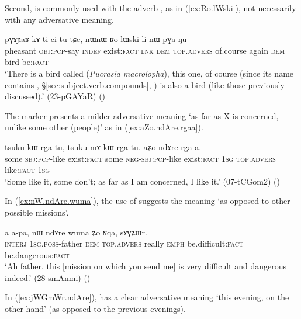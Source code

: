 Second,  is commonly used with the adverb , as in (\ref{ex:Ro.lWski}), not necessarily with any adversative meaning.

\begin{exe}
\ex \label{ex:Ro.lWski}
\gll  pɣɤɲaʁ kɤ-ti ci tu tɕe, nɯnɯ ʁo lɯski li nɯ pɣa ŋu \\
pheasant \textsc{obj}:\textsc{pcp}-say \textsc{indef} exist:\textsc{fact} \textsc{lnk} \textsc{dem} \textsc{top}.\textsc{advers} of.course again \textsc{dem} bird be:\textsc{fact} \\
\glt `There is a bird called  (\textit{Pucrasia macrolopha}), this one, of course (since its name contains , §\ref{sec:subject.verb.compounds}, ) is also a bird (like those previously discussed).' (23-pGAYaR)
()
\end{exe}

The marker  presents a milder adversative meaning `as far as X is concerned, unlike some other (people)' as in (\ref{ex:aZo.ndAre.rgaa}).  

\begin{exe}
\ex \label{ex:aZo.ndAre.rgaa}
\gll tsuku kɯ-rga tu, tsuku mɤ-kɯ-rga tu. aʑo ndɤre rga-a. \\
some \textsc{sbj}:\textsc{pcp}-like exist:\textsc{fact} some \textsc{neg}-\textsc{sbj}:\textsc{pcp}-like exist:\textsc{fact} \textsc{1sg} \textsc{top}.\textsc{advers} like:\textsc{fact}-\textsc{1sg} \\
\glt `Some like it, some don't; as far as I am concerned, I like it.' (07-tCGom2) ()
\end{exe}

In (\ref{ex:nW.ndAre.wuma}), the use of  suggests the meaning `as opposed to other possible missions'.

\begin{exe}
\ex \label{ex:nW.ndAre.wuma}
\gll a a-pa, nɯ ndɤre wuma ʑo ɴqa, sɤɣʑɯr. \\
\textsc{interj} \textsc{1sg}.\textsc{poss}-father \textsc{dem} \textsc{top}.\textsc{advers} really \textsc{emph} be.difficult:\textsc{fact} be.dangerous:\textsc{fact} \\
\glt `Ah father, this [mission on which you send me] is very difficult and dangerous indeed.' (28-smAnmi)
()
\end{exe}

In (\ref{ex:jWGmWr.ndAre}),  has a clear adversative meaning `this evening, on the other hand' (as opposed to the previous evenings).

